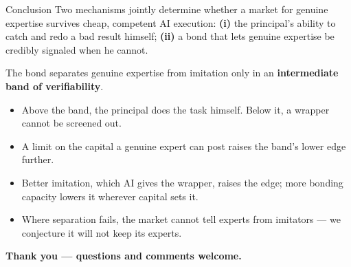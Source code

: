 \documentclass[11pt,aspectratio=169]{beamer}
\begin{document}
\begin{frame}{Conclusion}
\footnotesize
Two mechanisms jointly determine whether a market for genuine expertise survives cheap, competent AI execution: \textbf{(i)} the principal's ability to catch and redo a bad result himself; \textbf{(ii)} a bond that lets genuine expertise be credibly signaled when he cannot.
\vfill
\begin{block}{}
The bond separates genuine expertise from imitation only in an \textbf{intermediate band of verifiability}.
\end{block}
\vspace{2pt}
\begin{itemize}
  \item Above the band, the principal does the task himself. Below it, a wrapper cannot be screened out.
  \item A limit on the capital a genuine expert can post raises the band's lower edge further.
  \item Better imitation, which AI gives the wrapper, raises the edge; more bonding capacity lowers it wherever capital sets it.
  \item Where separation fails, the market cannot tell experts from imitators --- we conjecture it will not keep its experts.
\end{itemize}
\end{frame}

\begin{frame}{}
\vfill
\centering
\Large\textbf{Thank you --- questions and comments welcome.}
\vfill
\end{frame}
\end{document}
